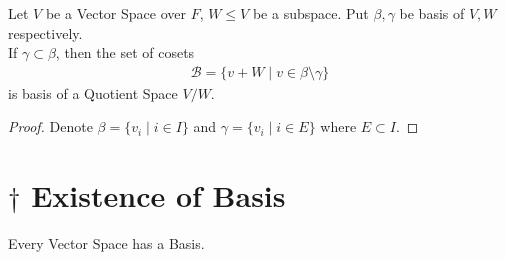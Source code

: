 \begin{theorem}
    Let $V$ be a Vector Space over $F$, $W \leq V$ be a subspace. Put $\beta, \gamma$ be basis of $V, W$ respectively. \\
    If $\gamma \subset \beta$, then the set of cosets
    \begin{align*}
        \mathcal{B} = \{v + W \mid v \in \beta \setminus \gamma\}
    \end{align*}
    is basis of a Quotient Space $V / W$.
\end{theorem}
\begin{proof}
    Denote $\beta = \{v_i \mid i \in I\}$ and $\gamma = \{v_i \mid i \in E\}$ where $E \subset I$.
\end{proof}

\newpage
\section{$\dagger$ Existence of Basis}
\begin{theorem}
    Every Vector Space has a Basis.
\end{theorem}
